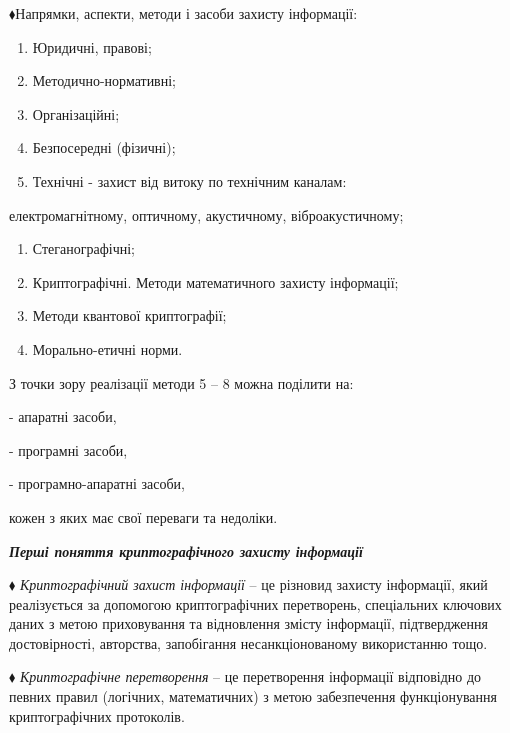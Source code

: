 \documentclass[a4paper]{article}
\newcounter{saveenum}
\newcommand\liststyleWWviiiNumxxxvii{%
\renewcommand\theenumi{\arabic{enumi}}
\renewcommand\theenumii{\arabic{enumi}.\arabic{enumii}}
\renewcommand\theenumiii{\arabic{enumi}.\arabic{enumii}.\arabic{enumiii}}
\renewcommand\labelenumi{\theenumi.}
\renewcommand\labelitemi{{}-}
\renewcommand\labelenumii{\theenumii.}
\renewcommand\labelenumiii{\theenumiii.}
}
\newcounter{}
\begin{document}
\bigskip

${\blacklozenge}$Напрямки, аспекти, методи і засоби захисту інформації:

\liststyleWWviiiNumxxxvii
\begin{enumerate}
\item Юридичні, правові;
\item Методично-нормативні;
\item Організаційні;
\item Безпосередні (фізичні);
\item Технічні - захист від витоку  по технічним каналам:
\end{enumerate}
електромагнітному, оптичному, акустичному, віброакустичному;

\liststyleWWviiiNumxxxvii
\setcounter{saveenum}{\value{enumi}}
\begin{enumerate}
\setcounter{enumi}{\value{saveenum}}
\item Стеганографічні;
\item Криптографічні. Методи математичного захисту інформації; 
\item Методи квантової криптографії; 
\item Морально-етичні норми.  
\end{enumerate}

\bigskip

З точки зору реалізації методи  5 – 8 можна поділити на:

{}- апаратні засоби,

{}- програмні засоби,

{}- програмно-апаратні засоби,

кожен з яких має свої переваги та недоліки. 


\bigskip


\bigskip

{\centering\bfseries\itshape
Перші поняття криптографічного  захисту інформації
\par}


\bigskip


\bigskip

${\blacklozenge}$ \textit{Криптографічний захист інформації }– це різновид
захисту інформації, який реалізується за допомогою криптографічних перетворень,
спеціальних ключових даних з метою приховування та відновлення змісту
інформації, підтвердження достовірності, авторства, запобігання
несанкціонованому використанню тощо.

${\blacklozenge}$ \textit{Криптографічне перетворення }– це перетворення
інформації відповідно до певних правил (логічних, математичних) з метою
забезпечення функціонування криптографічних протоколів.
\end{document}
